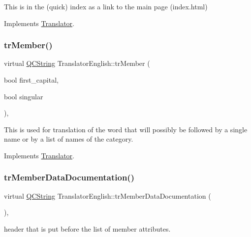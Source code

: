 This is in the (quick) index as a link to the main page (index.\+html) 

Implements \mbox{\hyperlink{class_translator}{Translator}}.

\mbox{\label{class_translator_english_a0c0baf2eb74e312cb72749bc06e67ec5}} 
\subsubsection{\texorpdfstring{trMember()}{trMember()}}
{\footnotesize\ttfamily virtual \mbox{\hyperlink{class_q_c_string}{Q\+C\+String}} Translator\+English\+::tr\+Member (\begin{DoxyParamCaption}\item[{bool}]{first\+\_\+capital,  }\item[{bool}]{singular }\end{DoxyParamCaption})\hspace{0.3cm}{\ttfamily [inline]}, {\ttfamily [virtual]}}

This is used for translation of the word that will possibly be followed by a single name or by a list of names of the category. 

Implements \mbox{\hyperlink{class_translator}{Translator}}.

\mbox{\label{class_translator_english_a7df6397d0b21e6c4682eaa823763bff3}} 
\subsubsection{\texorpdfstring{trMemberDataDocumentation()}{trMemberDataDocumentation()}}
{\footnotesize\ttfamily virtual \mbox{\hyperlink{class_q_c_string}{Q\+C\+String}} Translator\+English\+::tr\+Member\+Data\+Documentation (\begin{DoxyParamCaption}{ }\end{DoxyParamCaption})\hspace{0.3cm}{\ttfamily [inline]}, {\ttfamily [virtual]}}

header that is put before the list of member attributes. 

